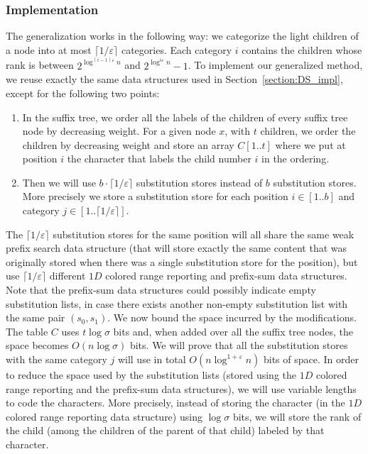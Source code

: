 \documentclass{article}
\newcommand{\?}{\mskip1.5mu}
\renewcommand{\epsilon}{\varepsilon}
\begin{document}
\subsubsection{Implementation}
The generalization works in the following way: we categorize the light children of a node into at most $\lceil1/\epsilon\rceil$ categories. Each category $i$ contains the children whose rank is between $2^{\log^{(i-1)\epsilon} n}$ and $2^{\log^{i\epsilon} n}-1$. 
To implement our generalized method, we reuse exactly the same data structures used in Section~\ref{section:DS_impl}, except for the following two points:
\begin{enumerate}
\item In the suffix tree, we order all the labels of the children of every suffix tree node by decreasing weight. For a given node $x$, with $t$ children, we order the children by decreasing weight and store an array $C[1..t]$ where we put at position $i$ the character that labels the child number $i$ in the ordering. 
\item Then we will use $b\cdot \lceil 1/\epsilon\rceil$ substitution stores instead of $b$ substitution stores. More precisely we store a substitution store for each position $i\in[1..b]$ and category $j\in[1..\lceil1/\epsilon\rceil]$. 
\end{enumerate}
The $\lceil 1/\epsilon\rceil$ substitution stores for the same position will all share the same weak prefix search data structure (that will store exactly the same content that was originally stored when there was a single substitution store for the position), but use $\lceil 1/\epsilon\rceil$ different $1D$ colored range reporting and prefix-sum data structures. Note that the prefix-sum data structures could possibly indicate empty substitution lists, in case there exists another non-empty substitution list with the same pair $(s_0,s_1)$. 
We now bound the space incurred by the modifications. The table $C$ uses $t\log\sigma$  bits and, when added over all the suffix tree nodes, the space becomes $O(n\log\sigma)$ bits. We will prove that all the substitution stores with the same category $j$ will use in total $O(n\log^{1+\epsilon} n)$ bits of space. 
In order to reduce the space used by the substitution lists (stored using the $1D$ colored range reporting and the prefix-sum data structures), we will use variable lengths to code the characters. More precisely, instead of storing the character (in the $1D$ colored range reporting data structure) using $\log\sigma$ bits, we will store the rank of the child (among the children of the parent of that child) labeled by that character. 
\end{document}
